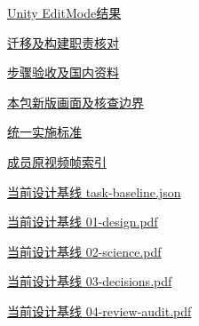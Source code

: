 \documentclass[11pt,a4paper]{article}
\begin{document}
\href{file:///D:/Agent/srp/agent/tasks/U-06/evidence/editmode-results.xml}{Unity EditMode结果}


\href{file:///D:/Agent/srp/agent/tasks/U-06/evidence/consumer-impact.md}{迁移及构建职责核对}


\href{file:///D:/Agent/srp/agent/tasks/U-06/TASK.md}{步骤验收及国内资料}


\href{file:///D:/Agent/srp/agent/tasks/U-06/outputs/current-implementation-evidence.md}{本包新版画面及核查边界}


\href{file:///D:/Agent/srp/agent/design/weather/2026-10-08_Storm\%E4\%B8\%8E\%E7\%BA\%AF\%E7\%B2\%92\%E5\%AD\%90\%E5\%8F\%8C\%E7\%8E\%AF\%E5\%AE\%9E\%E6\%96\%BD\%E6\%A0\%87\%E5\%87\%86.md}{统一实施标准}


\href{file:///D:/Agent/srp/human/assets/previews/2026-10-08/member-storm-particle-rings/frame-index.json}{成员原视频帧索引}


\href{file:///D:/Agent/srp/agent/design/design-foundation-20261008/task-baseline.json}{当前设计基线 task-\allowbreak{}baseline.json}


\href{file:///D:/Agent/srp/agent/design/design-foundation-20261008/01-design.pdf}{当前设计基线 01-\allowbreak{}design.pdf}


\href{file:///D:/Agent/srp/agent/design/design-foundation-20261008/02-science.pdf}{当前设计基线 02-\allowbreak{}science.pdf}


\href{file:///D:/Agent/srp/agent/design/design-foundation-20261008/03-decisions.pdf}{当前设计基线 03-\allowbreak{}decisions.pdf}


\href{file:///D:/Agent/srp/agent/design/design-foundation-20261008/04-review-audit.pdf}{当前设计基线 04-\allowbreak{}review-\allowbreak{}audit.pdf}
\end{document}
